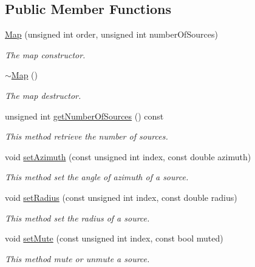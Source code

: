 \subsection*{Public Member Functions}
\begin{DoxyCompactItemize}
\item 
\hyperlink{class_hoa2_d_1_1_map_a22720e5b9ab041bb970d4dc43086558c}{Map} (unsigned int order, unsigned int number\-Of\-Sources)
\begin{DoxyCompactList}\small\item\em The map constructor. \end{DoxyCompactList}\item 
\hyperlink{class_hoa2_d_1_1_map_a47d01e332e6c19015e9fd94e8898f4f3}{$\sim$\-Map} ()
\begin{DoxyCompactList}\small\item\em The map destructor. \end{DoxyCompactList}\item 
unsigned int \hyperlink{class_hoa2_d_1_1_map_aef1bab3391d2292182a9b8205200e9af}{get\-Number\-Of\-Sources} () const 
\begin{DoxyCompactList}\small\item\em This method retrieve the number of sources. \end{DoxyCompactList}\item 
void \hyperlink{class_hoa2_d_1_1_map_aa5e77ccf4d3e2aaf75162180c18e202d}{set\-Azimuth} (const unsigned int index, const double azimuth)
\begin{DoxyCompactList}\small\item\em This method set the angle of azimuth of a source. \end{DoxyCompactList}\item 
void \hyperlink{class_hoa2_d_1_1_map_a48b9f89f5fcdab909f1fd50a7256a9f0}{set\-Radius} (const unsigned int index, const double radius)
\begin{DoxyCompactList}\small\item\em This method set the radius of a source. \end{DoxyCompactList}\item 
void \hyperlink{class_hoa2_d_1_1_map_a318a974ce6e0d5607a2fe4973093c9b9}{set\-Mute} (const unsigned int index, const bool muted)
\begin{DoxyCompactList}\small\item\em This method mute or unmute a source. \end{DoxyCompactList}\item 

\end{DoxyCompactItemize}
